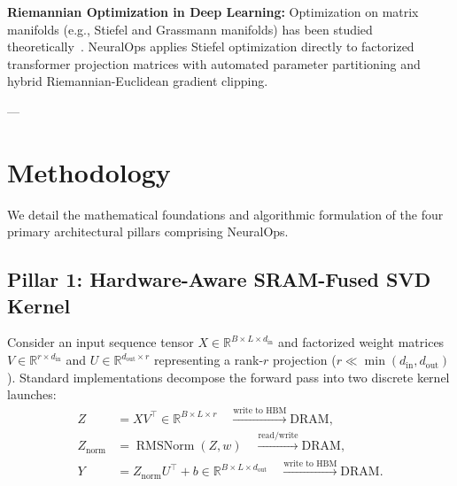 \documentclass[10pt,twocolumn,letterpaper]{article}
\begin{document}
\textbf{Riemannian Optimization in Deep Learning:} Optimization on matrix manifolds (e.g., Stiefel and Grassmann manifolds) has been studied theoretically~\cite{absil2008optimization,edelman1998geometry}. NeuralOps applies Stiefel optimization directly to factorized transformer projection matrices with automated parameter partitioning and hybrid Riemannian-Euclidean gradient clipping.

---

\section{Methodology}
\label{sec:method}

We detail the mathematical foundations and algorithmic formulation of the four primary architectural pillars comprising NeuralOps.

\subsection{Pillar 1: Hardware-Aware SRAM-Fused SVD Kernel}
\label{sec:fused_kernel}

Consider an input sequence tensor $X \in \mathbb{R}^{B \times L \times d_{\text{in}}}$ and factorized weight matrices $V \in \mathbb{R}^{r \times d_{\text{in}}}$ and $U \in \mathbb{R}^{d_{\text{out}} \times r}$ representing a rank-$r$ projection ($r \ll \min(d_{\text{in}}, d_{\text{out}})$). Standard implementations decompose the forward pass into two discrete kernel launches:
\begin{align}
Z &= X V^\top \in \mathbb{R}^{B \times L \times r} \quad \xrightarrow{\text{write to HBM}} \text{DRAM}, \\
Z_{\text{norm}} &= \operatorname{RMSNorm}(Z, w) \quad \xrightarrow{\text{read/write}} \text{DRAM}, \\
Y &= Z_{\text{norm}} U^\top + b \in \mathbb{R}^{B \times L \times d_{\text{out}}} \quad \xrightarrow{\text{write to HBM}} \text{DRAM}.
\end{align}
\end{document}
